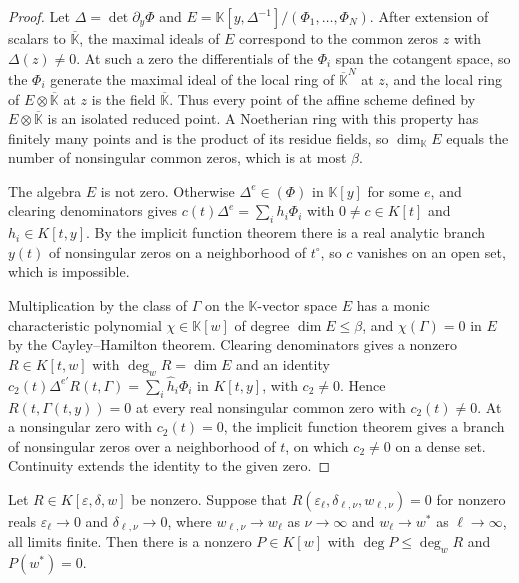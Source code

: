 \begin{proof}
Let $\Delta=\det\partial_y\Phi$ and
$E=\mathbb K[y,\Delta^{-1}]/(\Phi_1,\ldots,\Phi_N)$. After extension of
scalars to $\overline{\mathbb K}$, the maximal ideals of $E$ correspond to
the common zeros $z$ with $\Delta(z)\ne0$. At such a zero the differentials of
the $\Phi_i$ span the cotangent space, so the $\Phi_i$ generate the maximal
ideal of the local ring of $\overline{\mathbb K}^N$ at $z$, and the local ring of
$E\otimes\overline{\mathbb K}$ at $z$ is the field $\overline{\mathbb K}$. Thus
every point of the affine scheme defined by $E\otimes\overline{\mathbb K}$ is
an isolated reduced point. A Noetherian ring with this property has finitely
many points and is the product of its residue fields, so
$\dim_{\mathbb K}E$ equals the number of nonsingular common zeros, which is at
most $\beta$.

The algebra $E$ is not zero. Otherwise $\Delta^e\in(\Phi)$ in
$\mathbb K[y]$ for some $e$, and clearing denominators gives
$c(t)\Delta^e=\sum_ih_i\Phi_i$ with $0\ne c\in K[t]$ and $h_i\in K[t,y]$. By the
implicit function theorem there is a real analytic branch $y(t)$ of
nonsingular zeros on a neighborhood of $t^\circ$, so $c$ vanishes on an open
set, which is impossible.

Multiplication by the class of $\Gamma$ on the $\mathbb K$-vector space $E$
has a monic characteristic polynomial $\chi\in\mathbb K[w]$ of degree
$\dim E\le\beta$, and $\chi(\Gamma)=0$ in $E$ by the Cayley--Hamilton
theorem. Clearing denominators gives a nonzero $R\in K[t,w]$ with
$\deg_wR=\dim E$ and an identity
$c_2(t)\Delta^{e'}R(t,\Gamma)=\sum_i\hat h_i\Phi_i$ in $K[t,y]$, with
$c_2\ne0$. Hence $R(t,\Gamma(t,y))=0$ at every real nonsingular common zero
with $c_2(t)\ne0$. At a nonsingular zero with $c_2(t)=0$, the implicit
function theorem gives a branch of nonsingular zeros over a neighborhood of
$t$, on which $c_2\ne0$ on a dense set. Continuity extends the identity to the
given zero.
\end{proof}

\begin{lemma}
\label{lem:qc-ordered-limits}
Let $R\in K[\varepsilon,\delta,w]$ be nonzero. Suppose that
$R(\varepsilon_\ell,\delta_{\ell,\nu},w_{\ell,\nu})=0$ for nonzero reals
$\varepsilon_\ell\to0$ and $\delta_{\ell,\nu}\to0$, where
$w_{\ell,\nu}\to w_\ell$ as $\nu\to\infty$ and $w_\ell\to w^*$ as
$\ell\to\infty$, all limits finite. Then there is a nonzero $P\in K[w]$ with
$\deg P\le\deg_wR$ and $P(w^*)=0$.
\end{lemma}


